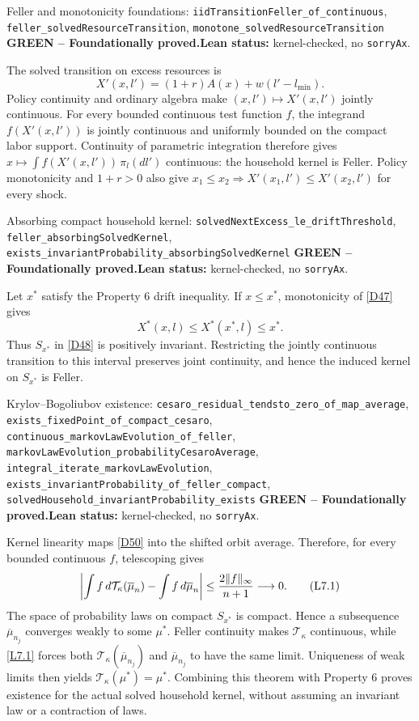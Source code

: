 \documentclass[11pt]{article}
\newcommand{\leanname}[1]{\nolinkurl{#1}}
\newcommand{\eqL}[1]{\refstepcounter{equation}\tag{L#1}}
\newcommand{\formalcheck}{\textbf{Lean status:} kernel-checked, no \texttt{sorryAx}.}
\newcommand{\greenstatus}{\textcolor{proved}{\textbf{GREEN -- Foundationally proved.}}}
\begin{document}
\begin{greenbox}{Feller and monotonicity foundations:
\leanname{iidTransitionFeller_of_continuous},
\leanname{feller_solvedResourceTransition},
\leanname{monotone_solvedResourceTransition}}
\greenstatus\quad\formalcheck

The solved transition on excess resources is
\[
 X'(x,l')=(1+r)A(x)+w(l'-l_{\min}).
\]
Policy continuity and ordinary algebra make \((x,l')\mapsto X'(x,l')\)
jointly continuous.  For every bounded continuous test function \(f\), the
integrand \(f(X'(x,l'))\) is jointly continuous and uniformly bounded on the
compact labor support.  Continuity of parametric integration therefore gives
\(x\mapsto\int f(X'(x,l'))\,\pi_l(dl')\) continuous: the household kernel is
Feller.  Policy monotonicity and \(1+r>0\) also give
\(x_1\le x_2\Rightarrow X'(x_1,l')\le X'(x_2,l')\) for every shock.
\end{greenbox}

\begin{greenbox}{Absorbing compact household kernel:
\leanname{solvedNextExcess_le_driftThreshold},
\leanname{feller_absorbingSolvedKernel},
\leanname{exists_invariantProbability_absorbingSolvedKernel}}
\greenstatus\quad\formalcheck

Let \(x^*\) satisfy the Property 6 drift inequality.  If \(x\le x^*\),
monotonicity of \eqref{D47} gives
\[
 X^*(x,l)\le X^*(x^*,l)\le x^*.
\]
Thus \(S_{x^*}\) in \eqref{D48} is positively invariant.  Restricting the
jointly continuous transition to this interval preserves joint continuity,
and hence the induced kernel on \(S_{x^*}\) is Feller.
\end{greenbox}

\begin{greenbox}{Krylov--Bogoliubov existence:
\leanname{cesaro_residual_tendsto_zero_of_map_average},
\leanname{exists_fixedPoint_of_compact_cesaro},
\leanname{continuous_markovLawEvolution_of_feller},
\leanname{markovLawEvolution_probabilityCesaroAverage},
\leanname{integral_iterate_markovLawEvolution},
\leanname{exists_invariantProbability_of_feller_compact},
\leanname{solvedHousehold_invariantProbability_exists}}
\greenstatus\quad\formalcheck

Kernel linearity maps \eqref{D50} into the shifted orbit average.  Therefore,
for every bounded continuous \(f\), telescoping gives
\begin{equation}
 \left|\int f\,d\mathcal T_\kappa(\overline\mu_n)
       -\int f\,d\overline\mu_n\right|
 \le \frac{2\lVert f\rVert_\infty}{n+1}\longrightarrow0.
 \eqL{7.1}\label{L7.1}
\end{equation}
The space of probability laws on compact \(S_{x^*}\) is compact.  Hence a
subsequence \(\overline\mu_{n_j}\) converges weakly to some \(\mu^*\).
Feller continuity makes \(\mathcal T_\kappa\) continuous, while
\eqref{L7.1} forces both \(\mathcal T_\kappa(\overline\mu_{n_j})\) and
\(\overline\mu_{n_j}\) to have the same limit.  Uniqueness of weak limits
then yields \(\mathcal T_\kappa(\mu^*)=\mu^*\).  Combining this theorem with
Property 6 proves existence for the actual solved household kernel, without
assuming an invariant law or a contraction of laws.
\end{greenbox}
\end{document}
